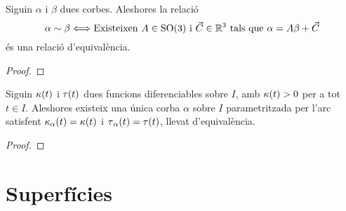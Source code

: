\documentclass[../Apunts.tex]{subfiles}
\begin{document}
	\begin{lemma}
		\label{lemma:Teorema Fonamental de la teoria local de corbes}
		Siguin \(\alpha\) i \(\beta\) dues corbes. Aleshores la relació
		\[\alpha\sim\beta \Longleftrightarrow \text{Existeixen }A\in\mathrm{SO}(3)\text{ i }\vec{C}\in\mathbb{R}^{3}\text{ tals que }\alpha=A\beta+\vec{C}\]
		és una relació d'equivalència.
		\begin{proof}
		\end{proof}
	\end{lemma}
	\begin{theorem}
		\label{thm:Teorema Fonamental de la teoria local del corbes}
		Siguin \(\operatorname{\kappa}(t)\) i \(\operatorname{\tau}(t)\) dues funcions diferenciables sobre \(I\), amb \(\operatorname{\kappa}(t)>0\) per a tot \(t\in I\). Aleshores existeix una única corba \(\alpha\) sobre \(I\) parametritzada per l'arc satisfent \(\operatorname{\kappa}_{\alpha}(t)=\operatorname{\kappa}(t)\) i \(\operatorname{\tau}_{\alpha}(t)=\operatorname{\tau}(t)\), llevat d'equivalència. %
		\begin{proof}
		\end{proof}
	\end{theorem}
\section{Superfícies}
\end{document}
